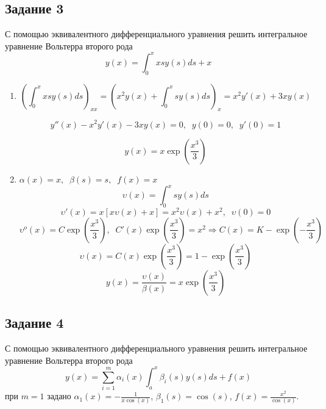\documentclass[
11pt,
master, %
subf, %
href, %
colorlinks=true, %
times, %
]{disser}
\begin{document}
\subsection{Задание 3}
С помощью эквивалентного дифференциального уравнения решить интегральное уравнение Вольтерра второго рода
$$y(x) = \int_{0}^{x} x s y(s) ds + x$$
\begin{enumerate}
  \item $$\left(\int_{0}^{x} xsy(s) ds\right)_{xx} = \left(x^2 y(x) + \int_{0}^{x} sy(s) ds\right)_x = x^2 y'(x) + 3xy(x)$$

$$y''(x) - x^2 y'(x) - 3xy(x) = 0, \;\; y(0) = 0, \;\; y'(0) = 1$$

$$y(x) = x\exp\left(\frac{x^3}{3}\right)$$

  \item
  $\displaystyle\alpha(x) = x,\;\; \beta(s) = s,\;\; f(x) = x$
  $$\upsilon(x) = \int_{0}^{x} s y(s) ds$$
  $$\upsilon'(x) = x[x\upsilon(x) + x] = x^2 \upsilon(x) + x^2, \;\; \upsilon(0) = 0$$
$$\upsilon^o(x) = C\exp\left(\frac{x^3}{3}\right), \;\; C'(x)\exp\left(\frac{x^3}{3}\right) = x^2 \Rightarrow C(x) = K - \exp\left(-\frac{x^3}{3}\right)$$
$$\upsilon(x) = C(x)\exp\left(\frac{x^3}{3}\right) = 1 - \exp\left(\frac{x^3}{3}\right)$$
$$y(x) = \frac{\upsilon(x)}{\beta(x)} = x\exp\left(\frac{x^3}{3}\right)$$
\end{enumerate}

\subsection{Задание 4}
С помощью эквивалентного дифференциального уравнения решить интегральное уравнение Вольтерра второго рода
$$y(x) = \sum_{i=1}^{m} \alpha_i(x) \int_{a}^{x} \beta_i(s) y(s) ds + f(x)$$
при $m=1$ задано $\alpha_1(x) = -\frac{1}{x \cos(x)}$, $\beta_1(s) = \cos(s)$, $f(x) = \frac{x^2}{\cos(x)}$.
\end{document}
